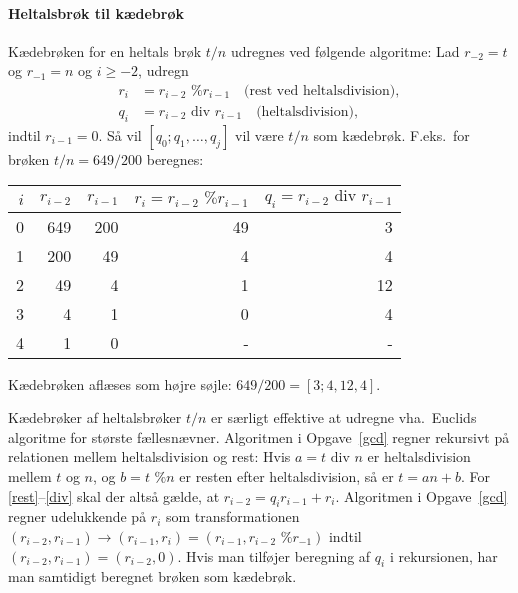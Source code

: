 \paragraph{Heltalsbrøk til kædebrøk}
Kædebrøken for en heltals brøk $t/n$ udregnes ved
følgende algoritme: Lad $r_{-2} = t$ og $r_{-1}=n$ og $i\geq-2$, udregn
\begin{align}
  r_i &= r_{i-2}\text{ \% }r_{i-1}\quad\text{(rest ved heltalsdivision)},\label{rest}
  \\q_i &= r_{i-2}\text{ div }r_{i-1}\quad\text{(heltalsdivision)},\label{div}
\end{align}
indtil $r_{i-1}=0$. Så vil $[q_0; q_1,\ldots,q_j]$ vil være $t/n$ som
kædebrøk. F.eks.\ for brøken $t/n = 649/200$ beregnes:
\begin{center}
  \begin{tabular}{|r|r|r|r|r|}
    \hline
    $i$ & $r_{i-2}$ & $r_{i-1}$ & $r_i = r_{i-2}\text{ \% }r_{i-1} $ & $q_i = r_{i-2} \text{ div } r_{i-1}$\\
    \hline
    0 & 649 & 200 & 49 & 3 \\
    1 & 200 & 49 & 4 & 4\\
    2 & 49 & 4 & 1  & 12\\
    3 & 4 & 1 & 0  & 4\\
    4 & 1 & 0 & -  & -\\
    \hline
  \end{tabular}
\end{center}
Kædebrøken aflæses som højre søjle: $649/200 = [3; 4, 12, 4]$.

Kædebrøker af heltalsbrøker $t/n$ er særligt effektive at udregne
vha.\ Euclids algoritme for største fællesnævner. Algoritmen i
Opgave~\ref{gcd} regner rekursivt på relationen mellem heltalsdivision
og rest: Hvis $a = t \text{ div } n$ er heltalsdivision mellem $t$ og
$n$, og $b = t \text{ \% } n$ er resten efter heltalsdivision, så er
$t = a n + b$. For \eqref{rest}--\eqref{div} skal der altså gælde, at
$r_{i-2} = q_i r_{i-1} + r_i$. Algoritmen i Opgave~\ref{gcd} regner
udelukkende på $r_i$ som transformationen
$(r_{i-2}, r_{i-1}) \rightarrow (r_{i-1}, r_i) = (r_{i-1},
r_{i-2}\text{ \% }r_{-1})$ indtil $(r_{i-2}, r_{i-1}) =
(r_{i-2},0)$. Hvis man tilføjer beregning af $q_i$ i rekursionen, har
man samtidigt beregnet brøken som kædebrøk.


